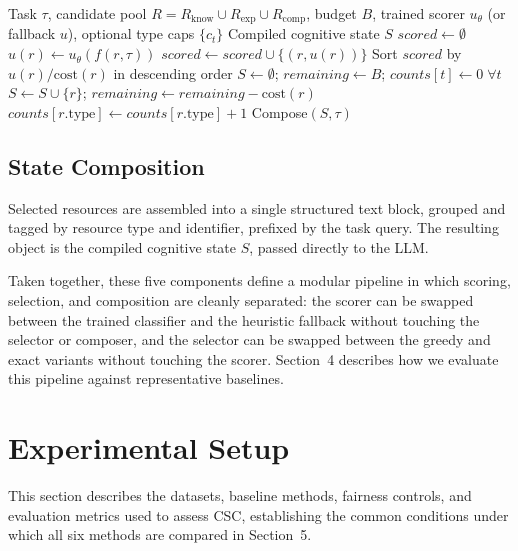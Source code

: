 \documentclass{article}
\begin{document}
\begin{algorithm}[t]
\caption{Cognitive State Compilation (CSC)~\citep{chen2016xgboost,dantzig1957}}
\begin{algorithmic}[1]
\Require Task $\tau$, candidate pool $R = R_{\text{know}} \cup R_{\text{exp}} \cup R_{\text{comp}}$, budget $B$, trained scorer $u_\theta$ (or fallback $u$), optional type caps $\{c_t\}$
\Ensure Compiled cognitive state $S$
\State $scored \gets \emptyset$
  \State $u(r) \gets u_\theta(f(r, \tau))$
  \State $scored \gets scored \cup \{(r, u(r))\}$
\EndFor
\State Sort $scored$ by $u(r)/\text{cost}(r)$ in descending order
\State $S \gets \emptyset$; $remaining \gets B$; $counts[t] \gets 0 \; \forall t$
    \State $S \gets S \cup \{r\}$; $remaining \gets remaining - \text{cost}(r)$
    \State $counts[r.\text{type}] \gets counts[r.\text{type}] + 1$
  \EndIf
\EndFor
\State \Return Compose$(S, \tau)$
\end{algorithmic}
\end{algorithm}

\subsection{State Composition}

Selected resources are assembled into a single structured text block, grouped and tagged by resource type and identifier, prefixed by the task query. The resulting object is the compiled cognitive state $S$, passed directly to the LLM.

Taken together, these five components define a modular pipeline in which scoring, selection, and composition are cleanly separated: the scorer can be swapped between the trained classifier and the heuristic fallback without touching the selector or composer, and the selector can be swapped between the greedy and exact variants without touching the scorer. Section~4 describes how we evaluate this pipeline against representative baselines.

\section{Experimental Setup}

This section describes the datasets, baseline methods, fairness controls, and evaluation metrics used to assess CSC, establishing the common conditions under which all six methods are compared in Section~5.
\end{document}
